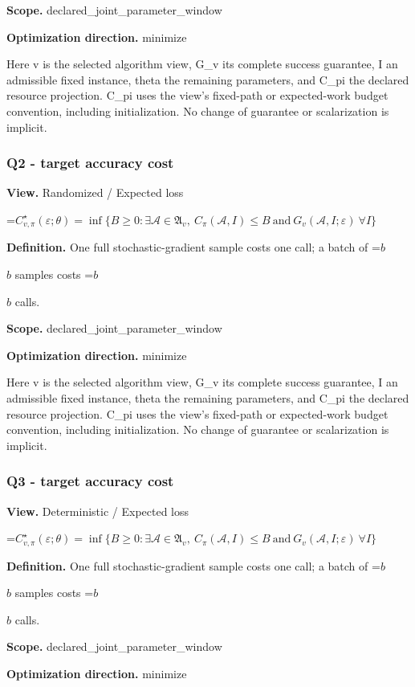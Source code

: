 \documentclass[10pt,a4paper]{article}
\newcommand{\AtlasMath}[1]{\par\begingroup\centering\setbox0=\hbox{$\displaystyle #1$}\ifdim\wd0>1.4\linewidth\typeout{ATLAS WIDE FORMULA: \the\wd0}\fi\ifdim\wd0>\linewidth\resizebox{\linewidth}{!}{\box0}\else\box0\fi\par\endgroup}
\newcommand{\AtlasInlineMath}[1]{\begingroup\setbox0=\hbox{$#1$}\ifdim\wd0>.4\linewidth\endgroup\AtlasMath{#1}\else\endgroup$#1$\fi}
\begin{document}
\textbf{Scope.} declared\_joint\_parameter\_window

\textbf{Optimization direction.} minimize

Here v is the selected algorithm view, G\_v its complete success guarantee, I an admissible fixed instance, theta the remaining parameters, and C\_pi the declared resource projection. C\_pi uses the view's fixed-path or expected-work budget convention, including initialization. No change of guarantee or scalarization is implicit.

\subsubsection{Q2 - target accuracy cost}
\textbf{View.} Randomized / Expected loss

\AtlasMath{C^\star_{v,\pi}(\varepsilon;\theta)=\inf\{B\ge0:\exists\mathcal A\in\mathfrak A_v,\ C_\pi(\mathcal A,I)\le B\ \text{and}\ G_v(\mathcal A,I;\varepsilon)\ \forall I\}}
\textbf{Definition.} One full stochastic-gradient sample costs one call; a batch of \AtlasInlineMath{b} samples costs \AtlasInlineMath{b} calls.

\textbf{Scope.} declared\_joint\_parameter\_window

\textbf{Optimization direction.} minimize

Here v is the selected algorithm view, G\_v its complete success guarantee, I an admissible fixed instance, theta the remaining parameters, and C\_pi the declared resource projection. C\_pi uses the view's fixed-path or expected-work budget convention, including initialization. No change of guarantee or scalarization is implicit.

\subsubsection{Q3 - target accuracy cost}
\textbf{View.} Deterministic / Expected loss

\AtlasMath{C^\star_{v,\pi}(\varepsilon;\theta)=\inf\{B\ge0:\exists\mathcal A\in\mathfrak A_v,\ C_\pi(\mathcal A,I)\le B\ \text{and}\ G_v(\mathcal A,I;\varepsilon)\ \forall I\}}
\textbf{Definition.} One full stochastic-gradient sample costs one call; a batch of \AtlasInlineMath{b} samples costs \AtlasInlineMath{b} calls.

\textbf{Scope.} declared\_joint\_parameter\_window

\textbf{Optimization direction.} minimize
\end{document}
